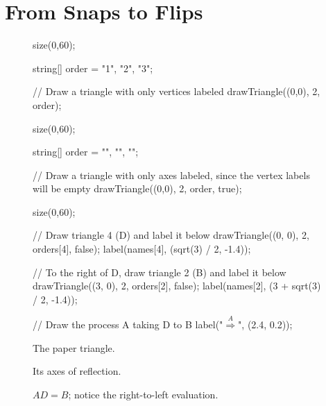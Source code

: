 \documentclass[../textbook.tex]{subfiles}
\begin{document}
\section{From Snaps to Flips}

\newcommand{\degree}{\ensuremath{^\circ}}

\begin{figure}[h]
	\begin{center}
		\begin{minipage}[b]{0.3\textwidth}
			\centering
			\begin{asy}[width=0.4\textwidth]
				size(0,60);

				string[] order = {"1", "2", "3"};

				// Draw a triangle with only vertices labeled
				drawTriangle((0,0), 2, order);
			\end{asy}
		\end{minipage}
		\hfill
		\begin{minipage}[b]{0.3\textwidth}
			\centering
			\begin{asy}[width=0.5\textwidth]
				size(0,60);

				string[] order = {"", "", ""};

				// Draw a triangle with only axes labeled, since the vertex labels will be empty
				drawTriangle((0,0), 2, order, true);
			\end{asy}
		\end{minipage}
		\hfill
		\begin{minipage}[b]{0.3\textwidth}
			\centering
			\begin{asy}[width=0.9\textwidth]
				size(0,60);

				// Draw triangle 4 (D) and label it below
				drawTriangle((0, 0), 2, orders[4], false);
				label(names[4], (sqrt(3) / 2, -1.4));

				// To the right of D, draw triangle 2 (B) and label it below
				drawTriangle((3, 0), 2, orders[2], false);
				label(names[2], (3 + sqrt(3) / 2, -1.4));

				// Draw the process A taking D to B
				label("$\stackrel{A}{\Longrightarrow}$", (2.4, 0.2));
			\end{asy}
		\end{minipage}
	\end{center}
	\vspace*{-2\baselineskip}
	\begin{center}
		\begin{minipage}[t]{0.3\textwidth}
			\caption{The paper triangle.}
			\label{fig:paper_triangle_sf}
		\end{minipage}
		\hfill
		\begin{minipage}[t]{0.3\textwidth}
			\caption{Its axes of reflection.}
			\label{fig:triangle_reflections_sf}
		\end{minipage}
		\hfill
		\begin{minipage}[t]{0.3\textwidth}
			\caption{$AD = B$; notice the right-to-left evaluation.}
			\label{fig:aid_is_b}
		\end{minipage}
	\end{center}


\end{figure}
\end{document}
